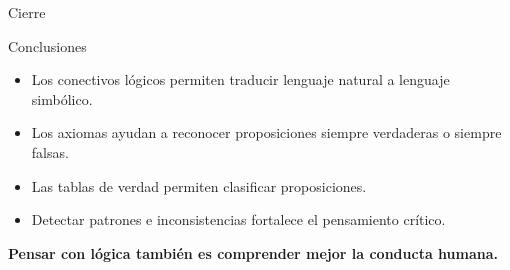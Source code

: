 \documentclass[aspectratio=169,10pt,handout]{beamer}
\newenvironment{Ejemplo}[1]
{
	\begin{exampleblock}{#1}
		\justifying
	}
	{
	\end{exampleblock}
}
\begin{document}
	\begin{frame}{Cierre}
		\begin{Ejemplo}{Conclusiones}
			\begin{itemize}[leftmargin=*,label=\textcolor{PsyAccent}{\large$\checkmark$}]
				\item Los conectivos lógicos permiten traducir lenguaje natural a lenguaje simbólico.
				\item Los axiomas ayudan a reconocer proposiciones siempre verdaderas o siempre falsas.
				\item Las tablas de verdad permiten clasificar proposiciones.
				\item Detectar patrones e inconsistencias fortalece el pensamiento crítico.
			\end{itemize}
		\end{Ejemplo}
		
		\vspace{0.4cm}
		
		\begin{center}
			{\Large \textcolor{PsyPrimary}{\textbf{Pensar con lógica también es comprender mejor la conducta humana.}}}
		\end{center}
	\end{frame}
	
\end{document}
